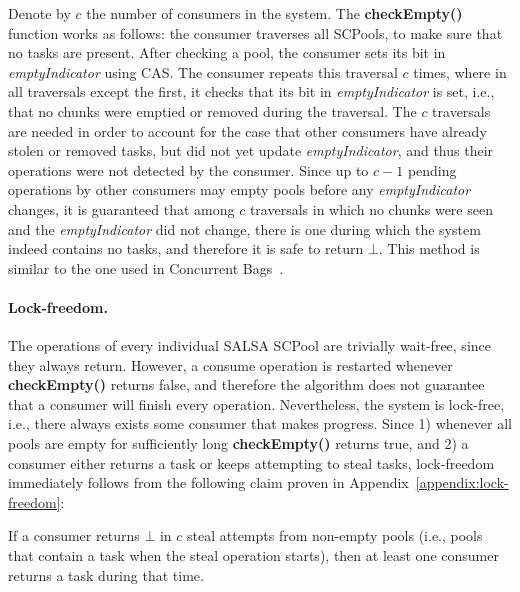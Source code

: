 Denote by $c$ the number of consumers in the system. The {\bf checkEmpty()} function works as follows: the consumer traverses all SCPools, to make sure that no tasks are present. After checking a pool, the consumer sets its bit in \emph{emptyIndicator} using CAS. The consumer repeats this traversal $c$ times, where in all traversals except the first, it checks that its bit in \emph{emptyIndicator} is set, i.e., that no chunks were emptied or removed during the traversal. The $c$ traversals are needed in order to account for the case that other consumers have already stolen or removed tasks, but did not yet update \emph{emptyIndicator}, and thus their operations were not detected by the consumer. Since up to $c-1$ pending operations by other consumers may empty pools before any \emph{emptyIndicator} changes, it is guaranteed that among $c$ traversals in which no chunks were seen and the \emph{emptyIndicator} did not change, there is one during which the system indeed contains no tasks, and therefore it is safe to return $\bot$. This method is similar to the one used in Concurrent Bags~\cite{Sundell:2011:LAC:1989493.1989550}.

\negspace
\paragraph{Lock-freedom.}
The operations of every individual SALSA SCPool are trivially wait-free, since they always return. However, a consume operation is restarted whenever {\bf checkEmpty()} returns false, and therefore the algorithm does not guarantee that a consumer will finish every operation. Nevertheless, the system is lock-free, i.e., there always exists some consumer that makes progress. Since 1) whenever all pools are empty for sufficiently long {\bf checkEmpty()} returns true, and 2) a consumer either returns a task or keeps attempting to steal tasks, lock-freedom immediately follows from the following claim proven in Appendix~\ref{appendix:lock-freedom}:

\begin{claim}
\label{claim:lock-free}
If a consumer returns $\bot$ in $c$ steal attempts from non-empty pools (i.e., pools that contain a task when the steal operation starts), then at least one consumer returns a task during that time. 
\end{claim}
